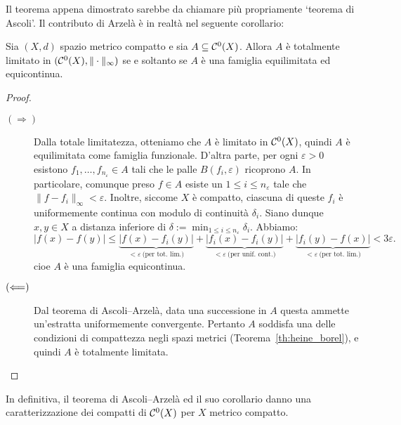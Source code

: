 Il teorema appena dimostrato sarebbe da chiamare più propriamente `teorema di Ascoli'. Il contributo di Arzelà è in realtà nel seguente corollario:

\begin{corollary}%
	Sia $(X,d)$ spazio metrico compatto e sia $A \subseteq \mathcal{C}^0(X)$.
	Allora $A$ è totalmente limitato in $(\mathcal{C}^0(X), \|\cdot\|_\infty)$ se e soltanto se $A$ è una famiglia equilimitata ed equicontinua.
\end{corollary}
\begin{proof}
	\leavevmode
	\begin{description}
		\item[$(\Longrightarrow)$] Dalla totale limitatezza, otteniamo che $A$ è limitato in $\mathcal{C}^0(X)$, quindi $A$ è equilimitata come famiglia funzionale.
		D'altra parte, per ogni $\varepsilon > 0$ esistono $f_1, \ldots, f_{n_\varepsilon} \in A$ tali che le palle $B(f_i, \varepsilon)$ ricoprono $A$. In particolare, comunque preso $f \in A$ esiste un $1 \leq i \leq n_\varepsilon$ tale che $\|f-f_i\|_\infty < \varepsilon$.
		Inoltre, siccome $X$ è compatto, ciascuna di queste $f_i$ è uniformemente continua con modulo di continuità $\delta_i$.
		Siano dunque $x, y \in X$ a distanza inferiore di $\delta := \min_{1 \leq i \leq n_\varepsilon} \delta_i$. Abbiamo:
		\begin{equation*}
			|f(x) - f(y)| \leq \underbrace{|f(x) - f_i(y)|}_{< \varepsilon\ \text{(per tot. lim.)}} + \underbrace{|f_i(x) - f_i(y)|}_{< \varepsilon\ \text{(per unif. cont.)}} + \underbrace{|f_i(y) - f(x)|}_{< \varepsilon\ \text{(per tot. lim.)}} < 3\varepsilon.
		\end{equation*}
		cioe $A$ è una famiglia equicontinua.

		\item[$(\Longleftarrow)$] Dal teorema di Ascoli--Arzelà, data una successione in $A$ questa ammette un'estratta uniformemente convergente.
		Pertanto $A$ soddisfa una delle condizioni di compattezza negli spazi metrici (Teorema~\ref{th:heine_borel}), e quindi $A$ è totalmente limitata.
	\end{description}
\end{proof}

In definitiva, il teorema di Ascoli--Arzelà ed il suo corollario danno una caratterizzazione dei compatti di $\mathcal{C}^0(X)$ per $X$ metrico compatto.

